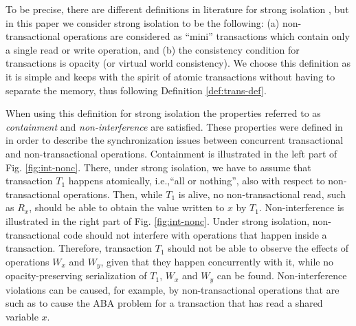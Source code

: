To be precise, there  are different  definitions in  literature for  strong 
isolation \cite{blundell06,ma07,harris06}, but
in this paper we consider strong isolation to be the following:
(a) non-transactional   operations   are   considered  as ``mini''
transactions which contain only a single  read or 
write operation, and (b) the consistency condition for transactions is opacity
(or virtual world consistency).
We choose this definition as it is simple and keeps with the spirit of atomic transactions
without having to separate the memory, thus following Definition \ref{def:trans-def}.
 
When using this definition for strong isolation the properties referred to as
{\it containment}  and {\it non-interference} are satisfied.
These properties were defined in \cite{blundell06} in order to describe
the synchronization issues between concurrent transactional and non-transactional operations.
Containment is   illustrated in  the  left  part of  Fig.
\ref{fig:int-nonc}.  There,
under strong  isolation, we have  to assume that transaction  $T_1$ happens
atomically,  
i.e.,``all  or  nothing'',   also  with  respect  to  non-transactional
operations. Then, while $T_1$ is  alive, no non-transactional read, such as
$R_x$, should be  
able to obtain  the value written to $x$  by $T_1$. Non-interference
is  illustrated  in  the right part of Fig.  \ref{fig:int-nonc}.  
Under  strong  isolation, non-transactional  
code   should  not  interfere   with  operations   that  happen   inside  a
transaction. Therefore, transaction $T_1$ should not be able to observe the
effects of  operations $W_x$ and $W_y$, given that they happen concurrently with it, 
while no opacity-preserving serialization of $T_1$, $W_x$ and $W_y$ can be found. 
Non-interference violations can be caused, for example,  by non-transactional 
operations that are such as to cause the ABA problem for a transaction that has 
read a shared variable $x$.


